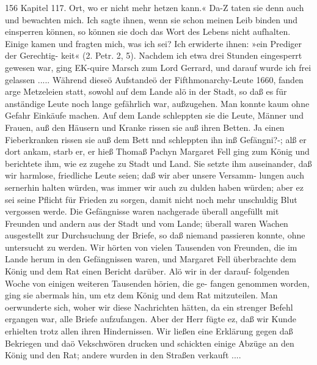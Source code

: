 156 Kapitel 117.
Ort, wo er nicht mehr hetzen kann.« Da-Z taten sie denn auch
und bewachten mich. Ich sagte ihnen, wenn sie schon meinen
Leib binden und einsperren können, so können sie doch das Wort
des Lebens nicht aufhalten. Einige kamen und fragten mich,
was ich sei? Ich erwiderte ihnen: »ein Prediger der Gerechtig-
keit« (2. Petr. 2, 5). Nachdem ich etwa drei Stunden eingesperrt
gewesen war, ging EK-quire Marsch zum Lord Gerrard, und darauf
wurde ich frei gelassen .....
Während dieseö Aufstandeö der Fifthmonarchy-Leute 1660,
fanden arge Metzeleien statt, sowohl auf dem Lande alö in der
Stadt, so daß es für anständige Leute noch lange gefährlich war,
außzugehen. Man konnte kaum ohne Gefahr Einkäufe machen.
Auf dem Lande schleppten sie die Leute, Männer und Frauen,
auß den Häusern und Kranke rissen sie auß ihren Betten. Ja
einen Fieberkranken rissen sie auß dem Bett nnd schleppten ihn
inß Gefängni?-; alß er dort ankam, starb er, er hieß Thomaß
Pachyn
Margaret Fell ging zum König und berichtete ihm, wie ez
zugehe zu Stadt und Land. Sie setzte ihm auseinander, daß wir
harmlose, friedliche Leute seien; daß wir aber unsere Versamm-
lungen auch sernerhin halten würden, was immer wir auch zu
dulden haben würden; aber ez sei seine Pflicht für Frieden zu
sorgen, damit nicht noch mehr unschuldig Blut vergossen werde.
Die Gefängnisse waren nachgerade überall angefüllt mit
Freunden und andern aus der Stadt und vom Lande; überall
waren Wachen ausgestellt zur Durchsuchung der Briefe, so daß
niemand passieren konnte, ohne untersucht zu werden. Wir hörten
von vielen Tausenden von Freunden, die im Lande herum in den
Gefängnissen waren, und Margaret Fell überbrachte dem König
und dem Rat einen Bericht darüber. Alö wir in der darauf-
folgenden Woche von einigen weiteren Tausenden hörien, die ge-
fangen genommen worden, ging sie abermals hin, um etz dem König
und dem Rat mitzuteilen. Man oerwunderte sich, woher wir
diese Nachrichten hätten, da ein strenger Befehl ergangen war,
alle Briefe aufzufangen. Aber der Herr fügte ez, daß wir Kunde
erhielten trotz allen ihren Hindernissen.
Wir ließen eine Erklärung gegen daß Bekriegen und daö
Vekschwören drucken und schickten einige Abzüge an den König
und den Rat; andere wurden in den Straßen verkauft ....



